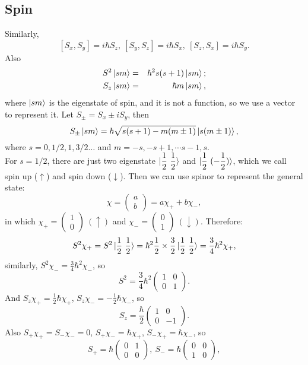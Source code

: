 \documentclass[12pt, 
]{article}
\begin{document}
\subsection{Spin}
Similarly, \[
	[S_x,S_y]=i\hbar S_z,~[S_y,S_z]=i\hbar S_x,~[S_z,S_x]=i\hbar S_y.
\]
Also
\begin{eqnarray*}
	S^2\ket{sm}&=&\hbar^2s(s+1)\ket{sm};\\
	S_z\ket{sm}&=&\hbar m\ket{sm},
\end{eqnarray*}
where $\ket{sm}$ is the eigenstate of spin, and it is not a function, so we use a vector to represent it.
Let $S_\pm=S_x\pm iS_y$, then
\begin{equation}
	S_\pm\ket{sm}=\hbar\sqrt{s(s+1)-m(m\pm1)}\ket{s(m\pm1)},
\end{equation}
where $s=0,1/2,1,3/2\dots$ and $m=-s, -s+1,\cdots s-1,s$.\\
For $s=1/2$, there are just two eigenstate $\displaystyle\ket{\frac{1}{2}~\frac{1}{2}}$ and $\displaystyle\ket{\frac{1}{2}~(-\frac{1}{2})}$, which we call spin up ($\uparrow$) and spin down ($\downarrow$). Then we can use spinor to represent the general state:
\[
	\chi= \begin{pmatrix}
		a\\b
	\end{pmatrix}=a\chi_++b\chi_{-}
,\]
in which $\chi_+= \begin{pmatrix}
	1\\0
\end{pmatrix}~(\uparrow)$ and $\chi_{-}= \begin{pmatrix}
	0\\1
\end{pmatrix}~(\downarrow)$. Therefore:
\[
	S^2\chi_+=S^2\ket{\frac{1}{2}~\frac{1}{2}}=\hbar^2\frac{1}{2}\times\frac{3}{2}\ket{\frac{1}{2}~\frac{1}{2}}=\frac{3}{4}\hbar^2\chi_+
,\]
similarly, $S^2\chi_{-}=\frac{3}{4}\hbar^2\chi_{-}$, so
\[
	S^2=\frac{3}{4}\hbar^2 \begin{pmatrix}
		1&0\\0&1
	\end{pmatrix}.
\]
And $S_z\chi_+=\frac{1}{2}\hbar\chi_+$, $S_z\chi_{-}=-\frac{1}{2}\hbar\chi_{-}$, so
\[
	S_z=\frac{\hbar}{2} \begin{pmatrix}
		1&0\\0&-1
	\end{pmatrix}.
\]
Also $S_+\chi_+=S_{-}\chi_{-}=0$, $S_+\chi_{-}=\hbar\chi_+$, $S_{-}\chi_+=\hbar\chi_{-}$, so
\[
	S_+=\hbar \begin{pmatrix}
		 0&1\\0&0
	\end{pmatrix},~S_{-}=\hbar \begin{pmatrix}
		0&0\\1&0
	\end{pmatrix},
\]
\end{document}
